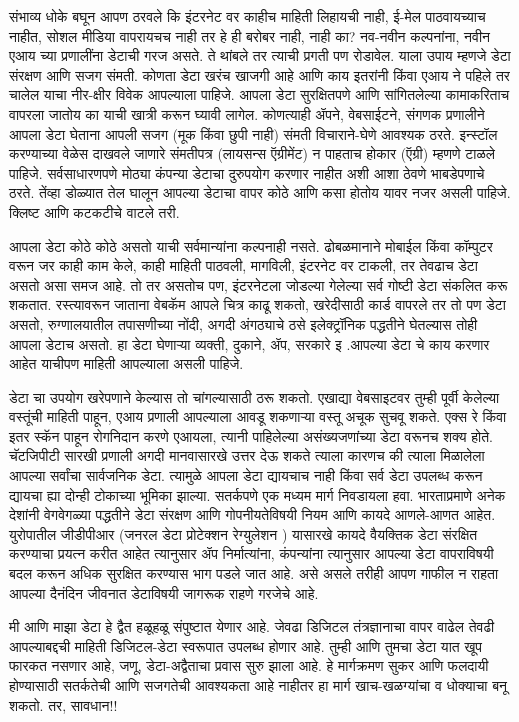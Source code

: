 संभाव्य धोके बघून आपण ठरवले कि इंटरनेट वर काहीच माहिती लिहायची नाही, ई-मेल पाठवायच्याच नाहीत, सोशल मीडिया वापरायचच नाही तर हे ही बरोबर नाही, नाही का? नव-नवीन कल्पनांना, नवीन एआय च्या प्रणालींना डेटाची गरज असते. ते थांबले तर त्याची प्रगती पण रोडावेल. याला उपाय म्हणजे डेटा संरक्षण आणि सजग संमती. कोणता डेटा खरंच खाजगी आहे आणि काय इतरांनी किंवा एआय ने पहिले तर चालेल याचा नीर-क्षीर विवेक आपल्याला पाहिजे. आपला डेटा सुरक्षितपणे आणि सांगितलेल्या कामाकरिताच वापरला जातोय का याची खात्री करून घ्यावी लागेल. कोणत्याही ॲपने, वेबसाईटने, संगणक प्रणालीने आपला डेटा घेताना आपली सजग (मूक किंवा छुपी नाही) संमती विचाराने-घेणे आवश्यक ठरते. इन्स्टॉल करण्याच्या वेळेस दाखवले जाणारे संमतीपत्र (लायसन्स ऍग्रीमेंट) न पाहताच होकार (ऍग्री) म्हणणे टाळले पाहिजे. सर्वसाधारणपणे मोठ्या कंपन्या डेटाचा दुरुपयोग करणार नाहीत अशी आशा ठेवणे भाबडेपणाचे ठरते. तेंव्हा डोळ्यात तेल घालून आपल्या डेटाचा वापर कोठे आणि कसा होतोय यावर नजर असली पाहिजे. क्लिष्ट आणि कटकटीचे वाटले तरी.

आपला डेटा कोठे कोठे असतो याची सर्वमान्यांना कल्पनाही नसते. ढोबळमानाने मोबाईल किंवा कॉम्पुटर वरून जर काही काम केले, काही माहिती पाठवली, मागविली, इंटरनेट वर टाकली, तर तेवढाच डेटा असतो असा समज आहे. तो तर असतोच पण, इंटरनेटला जोडल्या गेलेल्या सर्व गोष्टी डेटा संकलित करू शकतात. रस्त्यावरून जाताना वेबकॅम आपले चित्र काढू शकतो, खरेदीसाठी कार्ड वापरले तर तो पण डेटा असतो, रुग्णालयातील तपासणीच्या नोंदी, अगदी अंगठ्याचे ठसे इलेक्ट्रॉनिक पद्धतीने घेतल्यास तोही आपला डेटाच असतो. हा डेटा घेणाऱ्या व्यक्ती, दुकाने, ॲप, सरकारे इ .आपल्या डेटा चे काय करणार आहेत याचीपण माहिती आपल्याला असली पाहिजे.

डेटा चा उपयोग खरेपणाने केल्यास तो चांगल्यासाठी ठरू शकतो. एखाद्या वेबसाइटवर तुम्ही पूर्वी केलेल्या वस्तूंची माहिती पाहून, एआय प्रणाली आपल्याला आवडू शकणाऱ्या वस्तू अचूक सुचवू शकते. एक्स रे किंवा इतर स्कॅन पाहून रोगनिदान करणे एआयला, त्यानी पाहिलेल्या असंख्यजणांच्या डेटा वरूनच शक्य होते. चॅटजिपीटी सारखी प्रणाली अगदी मानवासारखे उत्तर देऊ शकते त्याला कारणच की त्याला मिळालेला आपल्या सर्वांचा सार्वजनिक डेटा. त्यामुळे आपला डेटा द्यायचाच नाही किंवा सर्व डेटा उपलब्ध करून द्यायचा ह्या दोन्ही टोकाच्या भूमिका झाल्या. सतर्कपणे एक मध्यम मार्ग निवडायला हवा. भारताप्रमाणे अनेक देशांनी वेगवेगळ्या पद्धतीने डेटा संरक्षण आणि गोपनीयतेविषयी नियम आणि कायदे आणले-आणत आहेत. युरोपातील जीडीपीआर (जनरल डेटा प्रोटेक्शन रेग्युलेशन ) यासारखे कायदे वैयक्तिक डेटा संरक्षित करण्याचा प्रयत्न करीत आहेत त्यानुसार ॲप निर्मात्यांना, कंपन्यांना त्यानुसार आपल्या डेटा वापराविषयी बदल करून अधिक सुरक्षित करण्यास भाग पडले जात आहे. असे असले तरीही आपण गाफील न राहता आपल्या दैनंदिन जीवनात डेटाविषयी जागरूक राहणे गरजेचे आहे.

मी आणि माझा डेटा हे द्वैत हळूहळू संपुष्टात येणार आहे. जेवढा डिजिटल तंत्रज्ञानाचा वापर वाढेल तेवढी आपल्याबद्दची माहिती डिजिटल-डेटा स्वरूपात उपलब्ध होणार आहे. तुम्ही आणि तुमचा डेटा यात खूप फारकत नसणार आहे, जणू, डेटा-अद्वैताचा प्रवास सुरु झाला आहे. हे मार्गक्रमण सुकर आणि फलदायी होण्यासाठी सतर्कतेची आणि सजगतेची आवश्यकता आहे नाहीतर हा मार्ग खाच-खळग्यांचा व धोक्याचा बनू शकतो. तर, सावधान!!